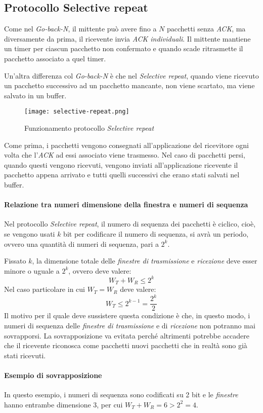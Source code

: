 \subsection{Protocollo Selective repeat}
Come nel \emph{Go-back-N}, il mittente può avere fino a $N$ pacchetti senza
\emph{ACK}, ma diversamente da prima, il ricevente invia \emph{ACK individuali}.
Il mittente mantiene un timer per ciascun pacchetto non confermato e quando
scade ritrasmette il pacchetto associato a quel timer.

Un'altra differenza col \emph{Go-back-N} è che nel \emph{Selective repeat},
quando viene ricevuto un pacchetto successivo ad un pacchetto mancante, non
viene scartato, ma viene salvato in un buffer.

\begin{figure}[ht]
    \centering
    \texttt{[image: selective-repeat.png]}
    \caption{Funzionamento protocollo \emph{Selective repeat}}
\end{figure}
\bigskip\noindent
Come prima, i pacchetti vengono consegnati all'applicazione del ricevitore ogni
volta che l'\emph{ACK} ad essi associato viene trasmesso. Nel caso di pacchetti
persi, quando questi vengono ricevuti, vengono inviati all'applicazione ricevente
il pacchetto appena arrivato e tutti quelli successivi che erano stati salvati
nel buffer.

\paragraph{Relazione tra numeri dimensione della finestra e numeri di sequenza}
Nel protocollo \emph{Selective repeat}, il numero di sequenza dei pacchetti è
ciclico, cioè, se vengono usati $k$ bit per codificare il numero di sequenza,
si avrà un periodo, ovvero una quantità di numeri di sequenza, pari a $2^k$.

Fissato $k$, la dimensione totale delle \emph{finestre di trasmissione} e
\emph{ricezione} deve esser minore o uguale a $2^k$, ovvero deve valere:
\[W_T+W_R\leq2^k\]
Nel caso particolare in cui $W_T=W_R$ deve valere:
\[W_T\leq2^{k-1}=\frac{2^k}{2}\]
Il motivo per il quale deve sussistere questa condizione è che, in questo modo,
i numeri di sequenza delle \emph{finestre di trasmissione} e di \emph{ricezione}
non potranno mai sovrapporsi. La sovrapposizione va evitata perché altrimenti
potrebbe accadere che il ricevente riconosca come pacchetti nuovi pacchetti che
in realtà sono già stati ricevuti.
\paragraph{Esempio di sovrapposizione}
In questo esempio, i numeri di sequenza sono codificati su 2 bit e le
\emph{finestre} hanno entrambe dimensione $3$, per cui $W_T+W_R=6>2^2=4$.

